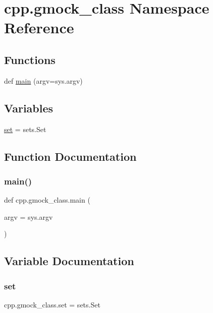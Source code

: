 \hypertarget{namespacecpp_1_1gmock__class}{}\section{cpp.\+gmock\+\_\+class Namespace Reference}
\label{namespacecpp_1_1gmock__class}
\subsection*{Functions}
\begin{DoxyCompactItemize}
\item 
def \hyperlink{namespacecpp_1_1gmock__class_a8f99cfdd2b4f0a547d6585b1de78bac0}{main} (argv=sys.\+argv)
\end{DoxyCompactItemize}
\subsection*{Variables}
\begin{DoxyCompactItemize}
\item 
\hyperlink{namespacecpp_1_1gmock__class_a2157e96eee0b4bf9ca6d195ab76f59c2}{set} = sets.\+Set
\end{DoxyCompactItemize}


\subsection{Function Documentation}
\mbox{\label{namespacecpp_1_1gmock__class_a8f99cfdd2b4f0a547d6585b1de78bac0}} 
\subsubsection{\texorpdfstring{main()}{main()}}
{\footnotesize\ttfamily def cpp.\+gmock\+\_\+class.\+main (\begin{DoxyParamCaption}\item[{}]{argv = {\ttfamily sys.argv} }\end{DoxyParamCaption})}



\subsection{Variable Documentation}
\mbox{\label{namespacecpp_1_1gmock__class_a2157e96eee0b4bf9ca6d195ab76f59c2}} 
\subsubsection{\texorpdfstring{set}{set}}
{\footnotesize\ttfamily cpp.\+gmock\+\_\+class.\+set = sets.\+Set}

